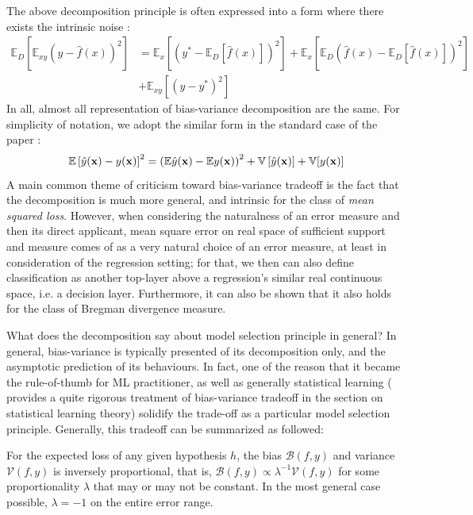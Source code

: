 \documentclass[10pt]{article} %
\begin{document}
The above decomposition principle is often expressed into a form where there exists the intrinsic noise \cite{brown2024biasvariance}: 
\begin{equation}
    \begin{split}
        \mathbb{E}_D \left[ \mathbb{E}_{xy} \left( y - \hat{f}(x) \right)^2 \right]
        &= 
         \mathbb{E}_x \left[ \left( y^* - \mathbb{E}_D[\hat{f}(x)] \right)^2 \right]
        + \mathbb{E}_x \left[ \mathbb{E}_D \left( \hat{f}(x) - \mathbb{E}_D[\hat{f}(x)] \right)^2 \right] \\
        &+ \mathbb{E}_{xy} \left[ \left( y - y^* \right)^2 \right]
    \end{split}
    \end{equation}
In all, almost all representation of bias-variance decomposition are the same. For simplicity of notation, we adopt the similar form in the standard case of the paper \cite{adlam2020understandingdoubledescentrequires}: 
\begin{equation}
    \mathbb{E} \left[{\hat{y}(\mathbf{x})-y(\mathbf{x})}\right]^2 = \left({\mathbb{E}\hat{y}(\mathbf{x}) - \mathbb{E} y(\mathbf{x})}\right)^2 + \mathbb{V}\left[{\hat{y}(\mathbf{x})}\right] + \mathbb{V}[{y(\mathbf{x})}]
\end{equation}
A main common theme of criticism toward bias-variance tradeoff is the fact that the decomposition is much more general, and intrinsic for the class of \textit{mean squared loss}. However, when considering the naturalness of an error measure and then its direct applicant, mean square error on real space of sufficient support and measure comes of as a very natural choice of an error measure, at least in consideration of the regression setting; for that, we then can also define classification as another top-layer above a regression's similar real continuous space, i.e. a decision layer. Furthermore, it can also be shown \cite{brown2024biasvariance,PfauBregmanDivergence} that it also holds for the class of Bregman divergence measure. 

What does the decomposition say about model selection principle in general? In general, bias-variance is typically presented of its decomposition only, and the asymptotic prediction of its behaviours. In fact, one of the reason that it became the rule-of-thumb for ML practitioner, as well as generally statistical learning (\cite{lafon_understanding_2024} provides a quite rigorous treatment of bias-variance tradeoff in the section on statistical learning theory) solidify the trade-off as a particular model selection principle. Generally, this tradeoff can be summarized as followed: 
\begin{theorem}
    For the expected loss of any given hypothesis $h$, the bias $\mathcal{B}(f,y)$ and variance $\mathcal{V}(f,y)$ is inversely proportional, that is, $\mathcal{B}(f,y)\propto \lambda^{-1} \mathcal{V}(f,y)$ for some proportionality $\lambda$ that may or may not be constant. In the most general case possible, $\lambda = -1$ on the entire error range. 
\end{theorem}
\end{document}
